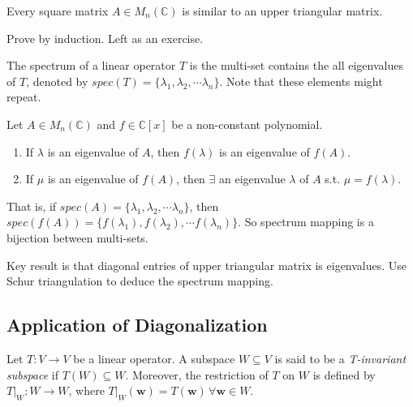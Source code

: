 \documentclass[12pt]{article}
\begin{document}
\begin{theorem}
    Every square matrix $A\in M_n(\mathbb{C})$ is similar to an upper triangular matrix.
\end{theorem}

\begin{pf}
    Prove by induction. Left as an exercise.
\end{pf}


\begin{definition}[Spectrum]
    The spectrum of a linear operator $T$ is the multi-set contains the all eigenvalues of $T$,
    denoted by $spec(T)=\{\lambda_1,\lambda_2,\cdots\lambda_n\}$. Note that these elements might repeat.
\end{definition}

\begin{theorem}
    Let $A\in M_n(\mathbb{C})$ and $f\in\mathbb{C}[x]$ be a non-constant polynomial. 
    \begin{enumerate}
        \item If $\lambda$ is an eigenvalue of $A$, then $f(\lambda)$ is an eigenvalue of $f(A)$.
        \item If $\mu$ is an eigenvalue of $f(A)$, then $\exists$ an eigenvalue $\lambda$ of $A$ s.t. $\mu=f(\lambda)$.
    \end{enumerate}
   That is, if  $spec(A)=\{\lambda_1,\lambda_2,\cdots\lambda_n\}$, then
    $spec(f(A))=\{f(\lambda_1),f(\lambda_2),\cdots f(\lambda_n)\}$.
    So spectrum mapping is a bijection between multi-sets. 
\end{theorem}

\begin{pf}
    Key result is that diagonal entries of upper triangular matrix is eigenvalues. Use Schur triangulation to deduce the spectrum mapping.
\end{pf}


\subsection{Application of Diagonalization}
\begin{definition}
    Let $T:V\rightarrow V$ be a linear operator. A subspace $W\subseteq V$ is said to be a \emph{T-invariant subspace} if $T(W)\subseteq W$.
    Moreover, the restriction of $T$ on $W$ is defined by $T|_{W}:W\rightarrow W$, where $T|_{W}(\mathbf{w})=T(\mathbf{w})\,\forall \mathbf{w}\in W$.
\end{definition}
\end{document}
